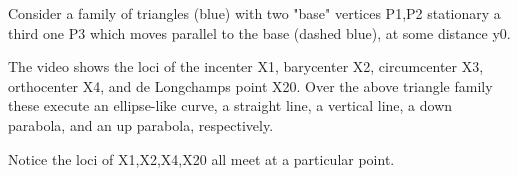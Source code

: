 Consider a family of triangles (blue) with two "base" vertices P1,P2 stationary a third one P3 which moves parallel to the base (dashed blue), at some distance y0.

The video shows the loci of the incenter X1, barycenter X2, circumcenter X3, orthocenter X4, and de Longchamps point X20. Over the above triangle family these execute an ellipse-like curve, a straight line, a vertical line, a down parabola, and an up parabola, respectively.

Notice the loci of X1,X2,X4,X20 all meet at a particular point.